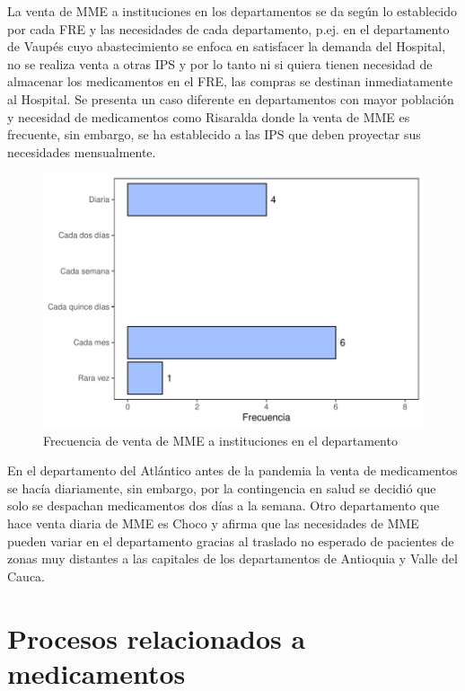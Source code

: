 \documentclass[
]{book}
\begin{document}
La venta de MME a instituciones en los departamentos se da según lo establecido por cada FRE y las necesidades de cada departamento, p.ej. en el departamento de Vaupés cuyo abastecimiento se enfoca en satisfacer la demanda del Hospital, no se realiza venta a otras IPS y por lo tanto ni si quiera tienen necesidad de almacenar los medicamentos en el FRE, las compras se destinan inmediatamente al Hospital. Se presenta un caso diferente en departamentos con mayor población y necesidad de medicamentos como Risaralda donde la venta de MME es frecuente, sin embargo, se ha establecido a las IPS que deben proyectar sus necesidades mensualmente.

\begin{figure}
\includegraphics[width=0.85\linewidth]{InformeFinal_files/figure-latex/FrecVentaInstituciones-1} \caption{Frecuencia de venta de MME a instituciones en el departamento}\label{fig:FrecVentaInstituciones}
\end{figure}

En el departamento del Atlántico antes de la pandemia la venta de medicamentos se hacía diariamente, sin embargo, por la contingencia en salud se decidió que solo se despachan medicamentos dos días a la semana. Otro departamento que hace venta diaria de MME es Choco y afirma que las necesidades de MME pueden variar en el departamento gracias al traslado no esperado de pacientes de zonas muy distantes a las capitales de los departamentos de Antioquia y Valle del Cauca.

\hypertarget{procesos-relacionados-a-medicamentos}{%
\section{Procesos relacionados a medicamentos}\label{procesos-relacionados-a-medicamentos}}
\end{document}
